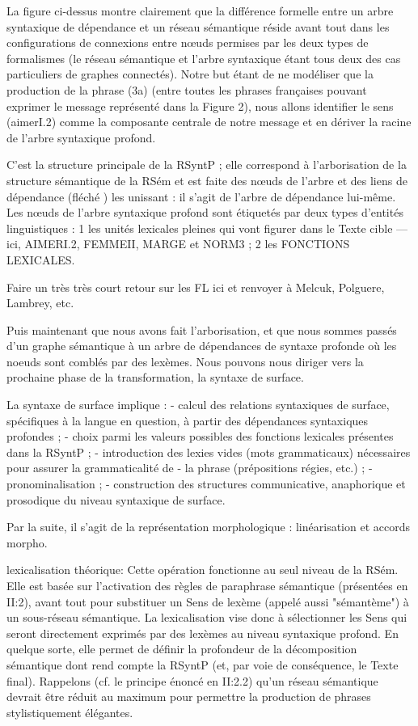 {La figure ci-dessus montre clairement que la différence formelle entre un arbre syntaxique de dépendance et un réseau sémantique réside avant tout dans les configurations de connexions entre nœuds permises par les deux types de formalismes (le réseau sémantique et l'arbre syntaxique étant tous deux des cas particuliers de graphes connectés). Notre but étant de ne modéliser que la production de la phrase (3a) (entre toutes les phrases françaises pouvant exprimer le message représenté dans la Figure 2), nous allons identifier le sens (aimerI.2) comme la composante centrale de notre message et en dériver la racine de l'arbre syntaxique profond.

C'est la structure principale de la RSyntP ; elle correspond à l'arborisation de la structure sémantique de la RSém et est faite des nœuds de l'arbre et des liens de dépendance (fléché ) les unissant : il s'agit de l'arbre de dépendance lui-même. Les nœuds de l'arbre syntaxique profond sont étiquetés par deux types d'entités linguistiques : 1 les unités lexicales pleines qui vont figurer dans le Texte cible — ici, AIMERI.2, FEMMEII, MARGE et NORM3 ; 2 les FONCTIONS LEXICALES.

Faire un très très court retour sur les FL ici et renvoyer à Melcuk, Polguere, Lambrey, etc.

Puis maintenant que nous avons fait l'arborisation, et que nous sommes passés d'un graphe sémantique à un arbre de dépendances de syntaxe profonde où les noeuds sont comblés par des lexèmes. Nous pouvons nous diriger vers la prochaine phase de la transformation, la syntaxe de surface. 

La syntaxe de surface implique :
- calcul des relations syntaxiques de surface, spécifiques à la langue en question, à partir des
dépendances syntaxiques profondes ;
- choix parmi les valeurs possibles des fonctions lexicales présentes dans la RSyntP ;
- introduction des lexies vides (mots grammaticaux) nécessaires pour assurer la grammaticalité de
- la phrase (prépositions régies, etc.) ;
- pronominalisation ;
- construction des structures communicative, anaphorique et prosodique du niveau syntaxique de
surface.

Par la suite, il s'agit de la représentation morphologique : 	linéarisation et accords morpho.

lexicalisation théorique: \citep{PolguereStructurationmisejeu1990}
Cette opération fonctionne au seul niveau de la RSém. Elle est basée sur l'activation des règles de paraphrase sémantique (présentées en II:2), avant tout pour substituer un Sens de lexème (appelé aussi "sémantème") à un sous-réseau sémantique. La lexicalisation vise donc à sélectionner les Sens qui seront directement exprimés par des lexèmes au niveau syntaxique  profond. En quelque sorte, elle permet de définir la profondeur de la décomposition sémantique dont rend compte la RSyntP (et, par voie de conséquence, le Texte final). Rappelons (cf. le principe énoncé en II:2.2) qu'un réseau sémantique devrait être réduit au maximum pour permettre la production de phrases stylistiquement élégantes.
}
